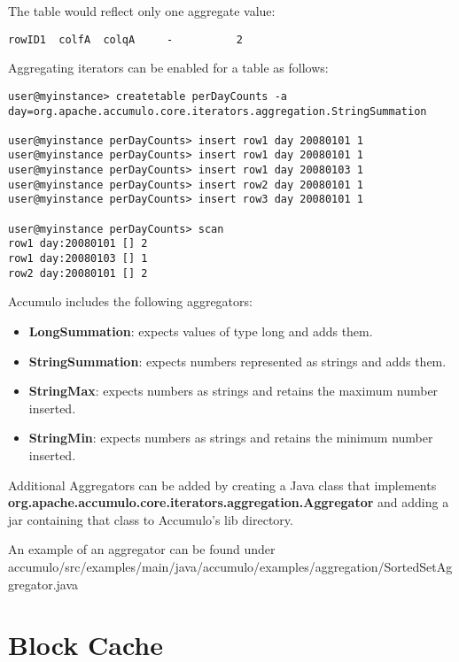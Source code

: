 The table would reflect only one aggregate value:

\small
\begin{verbatim}
rowID1  colfA  colqA     -          2
\end{verbatim}
\normalsize

Aggregating iterators can be enabled for a table as follows:

\small
\begin{verbatim}
user@myinstance> createtable perDayCounts -a
day=org.apache.accumulo.core.iterators.aggregation.StringSummation

user@myinstance perDayCounts> insert row1 day 20080101 1
user@myinstance perDayCounts> insert row1 day 20080101 1
user@myinstance perDayCounts> insert row1 day 20080103 1
user@myinstance perDayCounts> insert row2 day 20080101 1
user@myinstance perDayCounts> insert row3 day 20080101 1

user@myinstance perDayCounts> scan
row1 day:20080101 [] 2
row1 day:20080103 [] 1
row2 day:20080101 [] 2
\end{verbatim}
\normalsize

Accumulo includes the following aggregators:
\begin{itemize}
\item{\textbf{LongSummation}: expects values of type long and adds them.}
\item{\textbf{StringSummation}: expects numbers represented as strings and adds them.}
\item{\textbf{StringMax}: expects numbers as strings and retains the maximum number inserted.}
\item{\textbf{StringMin}: expects numbers as strings and retains the minimum number inserted.}
\end{itemize}

Additional Aggregators can be added by creating a Java class that implements\\
\textbf{org.apache.accumulo.core.iterators.aggregation.Aggregator} and adding a jar containing that
class to Accumulo's lib directory.

An example of an aggregator can be found under\\
accumulo/src/examples/main/java/accumulo/examples/aggregation/SortedSetAggregator.java


\section{Block Cache}

